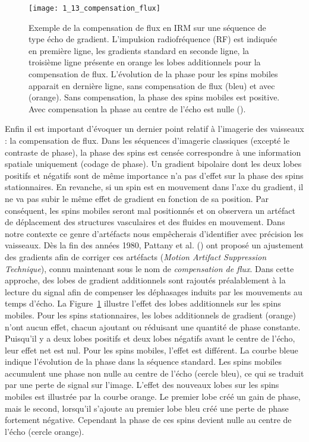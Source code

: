 \begin{figure}[!t]
\centering
\texttt{[image: 1\_13\_compensation\_flux]}
\caption{Exemple de la compensation de flux en IRM sur une séquence de type écho de gradient. L'impulsion radiofréquence (RF) est indiquée en première ligne, les gradients standard en seconde ligne, la troisième ligne présente en orange les lobes additionnels pour la compensation de flux. L'évolution de la phase pour les spins mobiles apparait en dernière ligne, sans compensation de flux (bleu) et avec (orange). Sans compensation, la phase des spins mobiles est positive. Avec compensation la phase au centre de l'écho est nulle (\cite{flowcompensation}). }
\label{fig:1_13_compensation_flux}	
\end{figure}

Enfin il est important d'évoquer un dernier point relatif à l'imagerie des vaisseaux : la compensation de flux. Dans les séquences d'imagerie classiques (excepté le contraste de phase), la phase des spins est censée correspondre à une information spatiale uniquement (codage de phase). Un gradient bipolaire dont les deux lobes positifs et négatifs sont de même importance n'a pas d'effet sur la phase des spins stationnaires. En revanche, si un spin est en mouvement dans l'axe du gradient, il ne va pas subir le même effet de gradient en fonction de sa position. Par conséquent, les spins mobiles seront mal positionnés et on observera un artéfact de déplacement des structures vasculaires et des fluides en mouvement. Dans notre contexte ce genre d'artéfacts nous empêcherais d'identifier avec précision les vaisseaux. Dès la fin des années 1980, Pattany et al. (\cite{Pattany1987}) ont proposé un ajustement des gradients afin de corriger ces artéfacts ({\em Motion Artifact Suppression Technique}), connu maintenant sous le nom de {\em compensation de flux}. Dans cette approche, des lobes de gradient additionnels sont rajoutés préalablement à la lecture du signal afin de compenser les déphasages induits par les mouvements au temps d'écho. La Figure~\ref{fig:1_13_compensation_flux} illustre l'effet des lobes additionnels sur les spins mobiles. Pour les spins stationnaires, les lobes additionnels de gradient (orange) n'ont aucun effet, chacun ajoutant ou réduisant une quantité de phase constante. Puisqu'il y a deux lobes positifs et deux lobes négatifs avant le centre de l'écho, leur effet net est nul. Pour les spins mobiles, l'effet est différent. La courbe bleue indique l'évolution de la phase dans la séquence standard. Les spins mobiles accumulent une phase non nulle au centre de l'écho (cercle bleu), ce qui se traduit par une perte de signal sur l'image. L'effet des nouveaux lobes sur les spins mobiles est illustrée par la courbe orange. Le premier lobe créé un gain de phase, mais le second, lorsqu'il s'ajoute au premier lobe bleu créé une perte de phase fortement négative. Cependant la phase de ces spins devient nulle au centre de l'écho (cercle orange).

